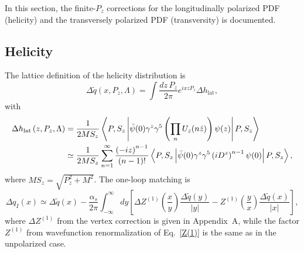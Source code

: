 
In this section, the finite-$P_z$ corrections for the longitudinally
polarized PDF (helicity) and the transversely polarized PDF
(transversity) is documented.

\subsection{Helicity}

The lattice definition of the helicity distribution is
%
\begin{equation}
\Delta \widetilde{q}(x,P_z,\Lambda) =
  \int \frac{dz\,P_z}{2\pi} e^{ixzP_z} \Delta h_\text{lat},
\end{equation}
%
with
%
\begin{align}
\Delta h_\text{lat}\left(z,P_z,\Lambda \right) &=
  \frac{1}{2M S_z} \left\langle P,S_z\left\vert
    \bar{\psi}(0)\gamma^z\gamma^5 \left(\prod_n U_z(n\hat{z})\right) \psi(z)
    \right\vert P,S_z\right\rangle  \notag \\
&\simeq \frac{1}{2M S_z} \sum_{n=1}^\infty
  \frac{\left(-iz\right)^{n-1}}{\left(n-1\right)!}
  \left\langle P,S_z\left\vert
  \bar{\psi}(0)\gamma^z\gamma^5\left(iD^z\right)^{n-1}\psi (0)
  \right\vert P,S_z\right\rangle ,  \label{Deltah}
\end{align}
%
where $M S_z = \sqrt{P_z^2+M^2}$.  The one-loop matching is
%
\begin{equation}
\Delta q_I(x) \simeq \Delta \widetilde{q}(x) -
  \frac{\alpha_s}{2\pi} \int_{-\infty}^\infty\!dy
    \left[ \Delta Z^{(1)}\!\!\left(\frac{x}{y}\right)
      \frac{\Delta \widetilde{q}(y)}{\left\vert y\right\vert}
      - Z^{(1)}\!\!\left(\frac{y}{x}\right)
      \frac{\Delta \widetilde{q}(x)}{\left\vert x\right\vert}\right] ,
\end{equation}
%
where $\Delta Z^{(1)}$ from the vertex correction is given in Appendix~A, while the factor $Z^{(1)}$ from wavefunction renormalization of Eq.~\ref{Z(1)} is the same as in the unpolarized case.

